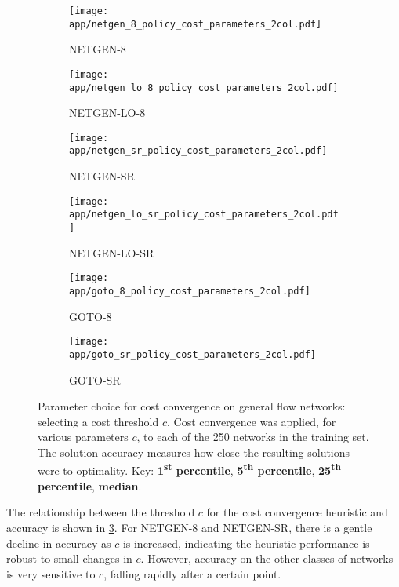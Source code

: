 \begin{figure}
    \begin{widepage}
        \begin{subfigure}[c]{0.5\textwidth}
            \texttt{[image: app/netgen\_8\_policy\_cost\_parameters\_2col.pdf]}
            \caption{NETGEN-8}
        \end{subfigure}
        \begin{subfigure}[c]{0.5\textwidth}
            \texttt{[image: app/netgen\_lo\_8\_policy\_cost\_parameters\_2col.pdf]}
            \caption{NETGEN-LO-8}
            \label{fig:app-general-cost-parameters:netgen-lo-8}
        \end{subfigure}
        \begin{subfigure}[c]{0.5\textwidth}
            \texttt{[image: app/netgen\_sr\_policy\_cost\_parameters\_2col.pdf]}
            \caption{NETGEN-SR}
        \end{subfigure}
        \begin{subfigure}[c]{0.5\textwidth}
            \texttt{[image: app/netgen\_lo\_sr\_policy\_cost\_parameters\_2col.pdf]}
            \caption{NETGEN-LO-SR}
            \label{fig:app-general-cost-parameters:netgen-lo-sr}
        \end{subfigure}
        \begin{subfigure}[c]{0.5\textwidth}
            \texttt{[image: app/goto\_8\_policy\_cost\_parameters\_2col.pdf]}
            \caption{GOTO-8}
        \end{subfigure}
        \begin{subfigure}[c]{0.5\textwidth}
            \texttt{[image: app/goto\_sr\_policy\_cost\_parameters\_2col.pdf]}
            \caption{GOTO-SR}
        \end{subfigure}
    \end{widepage}
    \caption[Parameter choice for cost convergence on general flow networks]{Parameter choice for cost convergence on general flow networks: selecting a cost threshold $c$. Cost convergence was applied, for various parameters $c$, to each of the 250 networks in the training set. The solution accuracy measures how close the resulting solutions were to optimality. Key: \textbf{\color{matplotlib_blue} 1\textsuperscript{st} percentile}, \textbf{\color{matplotlib_green} 5\textsuperscript{th} percentile}, \textbf{\color{matplotlib_red} 25\textsuperscript{th} percentile}, \textbf{\color{matplotlib_cyan} median}.}
    \label{fig:app-general-cost-parameters}
\end{figure}

The relationship between the threshold $c$ for the cost convergence heuristic and accuracy is shown in \cref{fig:app-general-cost-parameters}. For NETGEN-8 and NETGEN-SR, there is a gentle decline in accuracy as $c$ is increased, indicating the heuristic performance is robust to small changes in $c$. However, accuracy on the other classes of networks is very sensitive to $c$, falling rapidly after a certain point.

